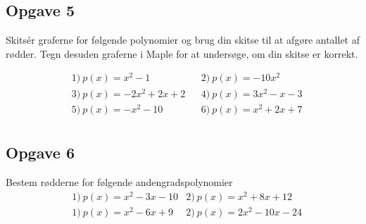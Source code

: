 \subsection*{Opgave 5}
Skitsér graferne for følgende polynomier og brug din skitse til at afgøre antallet af rødder. Tegn desuden graferne i Maple for at undersøge, om din skitse er korrekt.

\begin{align*}
&1) \  p(x) = x^2-1   &&2) \ p(x) = -10x^2    \\
&3) \  p(x) = -2x^2+2x+2  &&4) \  p(x) = 3x^2-x-3   \\
&5) \ p(x) = -x^2-10    &&6) \  p(x) = x^2+2x+7   \\
\end{align*}

\subsection*{Opgave 6}
Bestem rødderne for følgende andengradspolynomier
\begin{align*}
	&1) \ p(x) = x^2 - 3x - 10  &2) \   p(x) = x^2 + 8x + 12 \\
	&1) \ p(x) = x^2 -6x + 9  &2) \   p(x) = 2x^2-10x-24 \\
\end{align*}